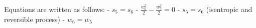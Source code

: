 Equations are written as follows:
- \( s_5 = s_6 \)
- \( \frac{w_6^2}{2} - \frac{w_5^2}{2} = 0 \)
- \( s_5 = s_6 \) (isentropic and reversible process)
- \( w_6 = w_5 \)